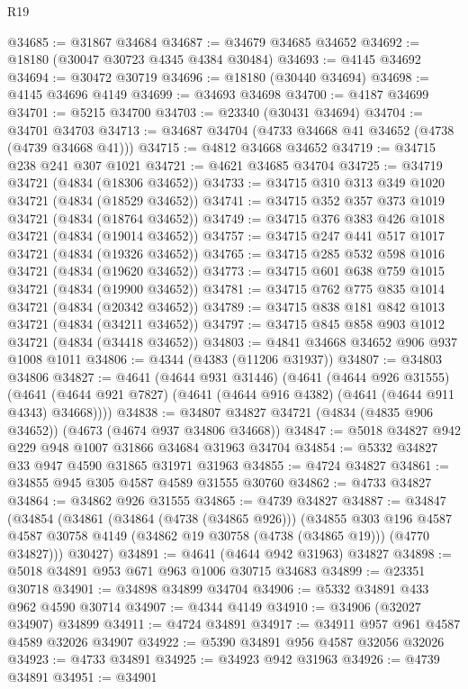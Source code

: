 \begin{lexlean}{R19}
\begin{coremodule}
@34685 := @31867 @34684
@34687 := @34679 @34685 @34652
@34692 := @18180 (@30047 @30723 @4345 @4384 @30484)
@34693 := @4145 @34692
@34694 := @30472 @30719
@34696 := @18180 (@30440 @34694)
@34698 := @4145 @34696 @4149
@34699 := @34693 @34698
@34700 := @4187 @34699
@34701 := @5215 @34700
@34703 := @23340 (@30431 @34694)
@34704 := @34701 @34703
@34713 := @34687 @34704 (@4733 @34668 @41 @34652 (@4738 (@4739 @34668 @41)))
@34715 := @4812 @34668 @34652
@34719 := @34715 @238 @241 @307 @1021
@34721 := @4621 @34685 @34704
@34725 := @34719 @34721 (@4834 (@18306 @34652))
@34733 := @34715 @310 @313 @349 @1020 @34721 (@4834 (@18529 @34652))
@34741 := @34715 @352 @357 @373 @1019 @34721 (@4834 (@18764 @34652))
@34749 := @34715 @376 @383 @426 @1018 @34721 (@4834 (@19014 @34652))
@34757 := @34715 @247 @441 @517 @1017 @34721 (@4834 (@19326 @34652))
@34765 := @34715 @285 @532 @598 @1016 @34721 (@4834 (@19620 @34652))
@34773 := @34715 @601 @638 @759 @1015 @34721 (@4834 (@19900 @34652))
@34781 := @34715 @762 @775 @835 @1014 @34721 (@4834 (@20342 @34652))
@34789 := @34715 @838 @181 @842 @1013 @34721 (@4834 (@34211 @34652))
@34797 := @34715 @845 @858 @903 @1012 @34721 (@4834 (@34418 @34652))
@34803 := @4841 @34668 @34652 @906 @937 @1008 @1011
@34806 := @4344 (@4383 (@11206 @31937))
@34807 := @34803 @34806
@34827 := @4641
    (@4644 @931 @31446)
    (@4641
      (@4644 @926 @31555)
      (@4641 (@4644 @921 @7827) (@4641 (@4644 @916 @4382) (@4641 (@4644 @911 @4343) @34668))))
@34838 := @34807 @34827 @34721 (@4834 (@4835 @906 @34652)) (@4673 (@4674 @937 @34806 @34668))
@34847 := @5018 @34827 @942 @229 @948 @1007 @31866 @34684 @31963 @34704
@34854 := @5332 @34827 @33 @947 @4590 @31865 @31971 @31963
@34855 := @4724 @34827
@34861 := @34855 @945 @305 @4587 @4589 @31555 @30760
@34862 := @4733 @34827
@34864 := @34862 @926 @31555
@34865 := @4739 @34827
@34887 := @34847
    (@34854
      (@34861
        (@34864 (@4738 (@34865 @926)))
        (@34855
          @303
          @196
          @4587
          @4587
          @30758
          @4149
          (@34862 @19 @30758 (@4738 (@34865 @19)))
          (@4770 @34827)))
      @30427)
@34891 := @4641 (@4644 @942 @31963) @34827
@34898 := @5018 @34891 @953 @671 @963 @1006 @30715 @34683
@34899 := @23351 @30718
@34901 := @34898 @34899 @34704
@34906 := @5332 @34891 @433 @962 @4590 @30714
@34907 := @4344 @4149
@34910 := @34906 (@32027 @34907) @34899
@34911 := @4724 @34891
@34917 := @34911 @957 @961 @4587 @4589 @32026 @34907
@34922 := @5390 @34891 @956 @4587 @32056 @32026
@34923 := @4733 @34891
@34925 := @34923 @942 @31963
@34926 := @4739 @34891
@34951 := @34901

\end{coremodule}
\end{lexlean}
